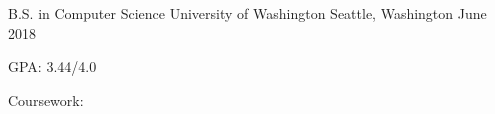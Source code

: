 \begin{cventries}
    \cventry
        {B.S. in Computer Science} %
        {University of Washington} %
        {Seattle, Washington} %
        {June 2018} %
        {\begin{cvitems} %
            \item
                {GPA: 3.44/4.0}
            \item 
                {Coursework:
                    \footnotesize{
                        \newline
                    }
                }
        \end{cvitems}
    }
\end{cventries}
